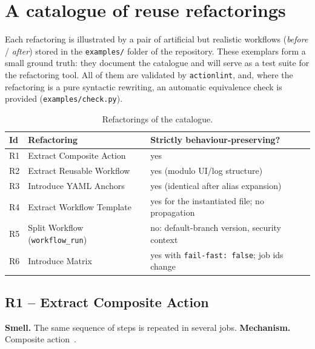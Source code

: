\documentclass[a4paper,11pt,notitlepage]{report}
\theoremstyle{definition}
\begin{document}

\chapter{A catalogue of reuse refactorings}
\label{ch:catalogue}

Each refactoring is illustrated by a pair of artificial but realistic workflows
(\emph{before} / \emph{after}) stored in the \texttt{examples/} folder of the repository.
These exemplars form a small ground truth: they document the catalogue and will serve as a
test suite for the refactoring tool. All of them are validated by
\texttt{actionlint}, and, where the refactoring is a pure syntactic rewriting,
an automatic equivalence check is provided (\texttt{examples/check.py}).

\begin{table}[ht]
\centering\small
\begin{tabularx}{\textwidth}{@{}llX@{}}
\toprule
\textbf{Id} & \textbf{Refactoring} & \textbf{Strictly behaviour-preserving?}\\
\midrule
R1 & Extract Composite Action & yes\\
R2 & Extract Reusable Workflow & yes (modulo UI/log structure)\\
R3 & Introduce YAML Anchors & yes (identical after alias expansion)\\
R4 & Extract Workflow Template & yes for the instantiated file; no propagation\\
R5 & Split Workflow (\texttt{workflow\_run}) & no: default-branch version, security context\\
R6 & Introduce Matrix & yes with \texttt{fail-fast: false}; job ids change\\
\bottomrule
\end{tabularx}
\caption{Refactorings of the catalogue.}
\label{tab:catalogue}
\end{table}

\section{R1 -- Extract Composite Action}\label{sec:r1}

\textbf{Smell.} The same sequence of steps is repeated in several jobs.
\textbf{Mechanism.} Composite action~\cite{GHDocsComposite}.
\end{document}
